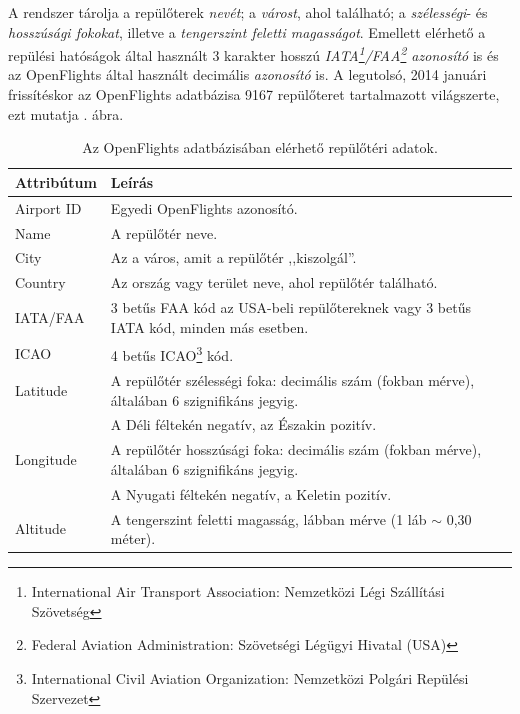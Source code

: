     A rendszer tárolja a repülőterek \textit{nevét}; a \textit{várost}, ahol található; a \textit{szélességi}- és \textit{hosszúsági fokokat}, illetve a \textit{tengerszint feletti magasságot}. Emellett elérhető a repülési hatóságok által használt 3 karakter hosszú \textit{IATA\footnote{International Air Transport Association: Nemzetközi Légi Szállítási Szövetség}/FAA\footnote{Federal Aviation Administration: Szövetségi Légügyi Hivatal (USA)} azonosító} is és az OpenFlights által használt decimális \textit{azonosító} is. A legutolsó, 2014 januári frissítéskor az OpenFlights adatbázisa 9167 repülőteret tartalmazott világszerte, ezt mutatja . ábra.

    \begin{table}[ht]
      \footnotesize
      \centering
      \begin{tabular}{ | l | l |}
      \hline
      Attribútum & Leírás \\ \hline
      Airport ID & Egyedi OpenFlights azonosító.\\
      Name & A repülőtér neve.\\
      City & Az a város, amit a repülőtér ,,kiszolgál''.\\
      Country & Az ország vagy terület neve, ahol repülőtér található.\\
      IATA/FAA & 3 betűs FAA kód az USA-beli repülőtereknek vagy 3 betűs IATA kód, minden más esetben.\\
      ICAO & 4 betűs ICAO\footnote{International Civil Aviation Organization: Nemzetközi Polgári Repülési Szervezet} kód.\\
      Latitude & A repülőtér szélességi foka: decimális szám (fokban mérve), általában 6 szignifikáns jegyig.\\
      & A Déli féltekén negatív, az Északin pozitív.\\
      Longitude & A repülőtér hosszúsági foka: decimális szám (fokban mérve), általában 6 szignifikáns jegyig.\\
      & A Nyugati féltekén negatív, a Keletin pozitív.\\
      Altitude & A tengerszint feletti magasság, lábban mérve (1 láb $\sim$ 0,30 méter).\\
      \hline
      \end{tabular}
      \caption{Az OpenFlights adatbázisában elérhető repülőtéri adatok.}
      \label{tab:table_repterek}
    \end{table}

